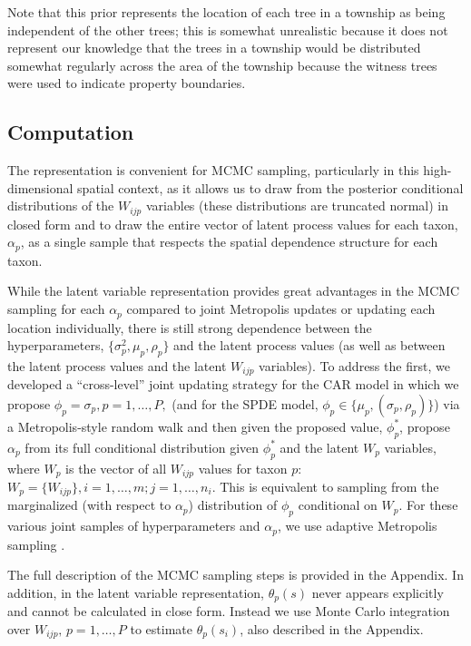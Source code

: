 \documentclass[12pt]{article}
\begin{document}
Note that this prior represents the location of each tree in a township
as being independent of the other trees; this is somewhat unrealistic
because it does not represent our knowledge that the trees in a township
would be distributed somewhat regularly across the area of the township
because the witness trees were used to indicate property boundaries.


\subsection{Computation}

The \cite{McCu:Ross:1994} representation is convenient for MCMC sampling,
particularly in this high-dimensional spatial context, as it allows
us to draw from the posterior conditional distributions of the $W_{ijp}$
variables (these distributions are truncated normal) in closed form
and to draw the entire vector of latent process values for each taxon,
$\alpha_{p}$, as a single sample that respects the spatial dependence
structure for each taxon.

While the latent variable representation provides great advantages
in the MCMC sampling for each $\alpha_{p}$ compared to joint Metropolis
updates or updating each location individually, there is still strong
dependence between the hyperparameters, $\{\sigma_{p}^{2},\mu_{p},\rho_{p}\}$
and the latent process values (as well as between the latent process
values and the latent $W_{ijp}$ variables). To address the first,
we developed a ``cross-level'' joint updating strategy for the CAR
model in which we propose $\phi_{p}=\sigma_{p},p=1,\ldots,P,$ (and
for the SPDE model, $\phi_{p}\in\{\mu_{p},(\sigma_{p},\rho_{p})\}$)
via a Metropolis-style random walk and then given the proposed value,
$\phi_{p}^{*}$, propose $\alpha_{p}$ from its full conditional distribution
given $\phi_{p}^{*}$ and the latent $W_{p}$ variables, where $W_{p}$
is the vector of all $W_{ijp}$ values for taxon $p$: $W_{p}=\{W_{ijp}\},i=1,\ldots,m;j=1,\ldots,n_{i}$.
This is equivalent to sampling from the marginalized (with respect
to $\alpha_{p}$) distribution of $\phi_{p}$ conditional on $W_{p}$.
For these various joint samples of hyperparameters and $\alpha_{p}$,
we use adaptive Metropolis sampling \citep{Shab:Well:2011}.

The full description of the MCMC sampling steps is provided in the
Appendix. In addition, in the latent variable representation, $\theta_{p}(s)$
never appears explicitly and cannot be calculated in close form. Instead
we use Monte Carlo integration over $W_{ijp},\, p=1,\ldots,P$ to
estimate $\theta_{p}(s_{i})$, also described in the Appendix. 
\end{document}
